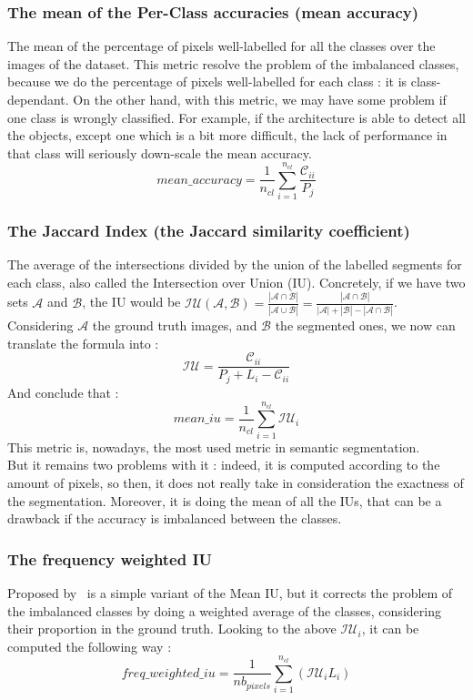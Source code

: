 \subsubsection{The mean of the Per-Class accuracies (mean accuracy)}
The mean of the percentage of pixels well-labelled for all the classes over the images of the dataset. This metric resolve the problem of the imbalanced classes, because we do the percentage of pixels well-labelled for each class : it is class-dependant. On the other hand, with this metric, we may have some problem if one class is wrongly classified. For example, if the architecture is able to detect all the objects, except one which is a bit more difficult, the lack of performance in that class will seriously	 down-scale the mean accuracy.
$$ mean\_accuracy = \frac{1}{n_{cl}} \sum_{i=1}^{n_{cl}} \frac{\mathcal{C}_{ii}}{P_j} $$
\subsubsection{The Jaccard Index (the Jaccard similarity coefficient)}
The average of the intersections divided by the union of the labelled segments for each class, also called the Intersection over Union (IU). Concretely, if we have two sets $\mathcal{A}$ and $\mathcal{B}$, the IU would be $\mathcal{IU}(\mathcal{A}, \mathcal{B}) = \frac{|\mathcal{A} \cap \mathcal{B}|}{|\mathcal{A} \cup \mathcal{B}|} = \frac{|\mathcal{A} \cap \mathcal{B}|}{|\mathcal{A}| + |\mathcal{B}| - |\mathcal{A} \cap \mathcal{B}|}$. \\
Considering $\mathcal{A}$ the ground truth images, and $\mathcal{B}$ the segmented ones, we now can translate the formula into :
$$ \mathcal{IU} = \frac{\mathcal{C}_{ii}}{P_j + L_i - \mathcal{C}_{ii}} $$
And conclude that :
$$ mean\_iu = \frac{1}{n_{cl}} \sum_{i=1	}^{n_{cl}} \mathcal{IU}_i $$
This metric is, nowadays, the most used metric in semantic segmentation. \\
But it remains two problems with it : indeed, it is computed according to the amount of pixels, so then, it does not really take in consideration the exactness of the segmentation. Moreover, it is doing the mean of all the IUs, that can be a drawback if the accuracy is imbalanced between the classes.
\subsubsection{The frequency weighted IU}
Proposed by~\cite{LONG15} is a simple variant of the Mean IU, but it corrects the problem of the imbalanced classes by doing a weighted average of the classes, considering their proportion in the ground truth. Looking to the above $\mathcal{IU}_i$, it can be computed the following way :
$$ freq\_weighted\_iu = \frac{1}{nb_{pixels}} \sum_{i=1}^{n_{cl}} ( \mathcal{IU}_i L_i ) $$
